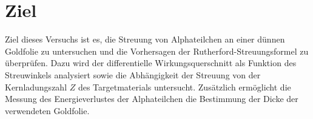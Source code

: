 \section{Ziel}
\label{sec:objective}

Ziel dieses Versuchs ist es, die Streuung von Alphateilchen an einer dünnen Goldfolie zu untersuchen und die Vorhersagen der Rutherford-Streuungsformel zu überprüfen. 
Dazu wird der differentielle Wirkungsquerschnitt als Funktion des Streuwinkels analysiert sowie die Abhängigkeit der Streuung von der Kernladungszahl $Z$ des Targetmaterials untersucht. 
Zusätzlich ermöglicht die Messung des Energieverlustes der Alphateilchen die Bestimmung der Dicke der verwendeten Goldfolie.

